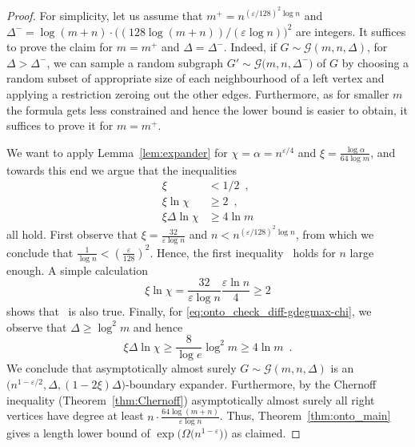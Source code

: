 \documentclass{theoretics}
\newcommand{\eqperiod}{\enspace .}
\newcommand{\eqcomma}{\enspace ,}
\newcommand{\refthm}[1]{Theorem~\ref{#1}}
\newcommand{\reflem}[1]{Lemma~\ref{#1}}
\newcommand{\diff}{\xi}
\newcommand{\ontocdiff}{64}
\newcommand{\GdegMax}{\Delta}
\newcommand{\gdegmax}{\GdegMax}
\newcommand{\Gdist}{\mathcal{G}}
\newcommand{\constonto}{128}
\newcommand{\exponentalpha}{\varepsilon}
\numberwithin{equation}{section}
\begin{document}
{
\begin{proof}
  For simplicity, let us assume that $m^{+} = n^{\left( \exponentalpha/\constonto \right)^2 \log n}$
  and $\gdegmax^{-} = \log (m + n) \cdot \bigl( ( \constonto \log (m + n))/
  (\exponentalpha \log n) \bigr)^2$ are
  integers.
  It suffices to prove the claim for 
  $m = m^{+}$ and $\gdegmax = \gdegmax^{-}$.
  Indeed, if $G \sim \Gdist \left(m,n,\GdegMax \right)$,
  for 
  $\GdegMax > \gdegmax^{-} $,
  we can sample a random subgraph
  $G' \sim \Gdist 
  \bigl(m,n,\gdegmax^{-} \bigr)$ of $G$
  by choosing a random subset of appropriate size of each neighbourhood
  of a left vertex and applying a restriction zeroing out the other
  edges.
  Furthermore,
  as for smaller $m$ the formula gets less constrained
  and hence the lower bound is easier to obtain, it suffices to prove it for
  $m = m^{+}$.

  We want to apply \reflem{lem:expander} for 
  $\chi = \alpha = n^{\exponentalpha/4}$
  and
  $\diff = \frac{\log \alpha}{\ontocdiff \log m}$,
  and towards this end we argue that
  the inequalities
  \begin{subequations}
    \begin{align}
      \label{eq:onto_check_diff}
      \diff &< 1/2 \eqcomma \\
      \label{eq:onto_check_diff-chi}
      \diff \ln \chi &\geq 2 \eqcomma \\
      \label{eq:onto_check_diff-gdegmax-chi}
      \diff \gdegmax \ln \chi &\geq 4 \ln m
    \end{align}
  \end{subequations}
  all hold.
  First observe that
  $\diff = \frac{32}{\exponentalpha \log n}$
  and 
  $n < n^{\left(\exponentalpha/\constonto\right)^2 \log n}$,
  from which we conclude that
  $\frac{1}{\log n} < \left(\frac{\exponentalpha}{\constonto}\right)^2$. 
  Hence, the first inequality~
  holds for $n$ large enough.
  A simple calculation
  \begin{equation}
  \diff \ln \chi 
  =
  \frac
  { 32  }
  { \varepsilon \log n}
  \frac{\varepsilon \ln n}{4}
   \ge 2
  \end{equation}
  shows that~ is also true.
  Finally, for
  \eqref{eq:onto_check_diff-gdegmax-chi},
  we observe that $\gdegmax \ge \log^2 m$ and hence
  \begin{equation}
    \diff \gdegmax \ln \chi 
    \ge
    \frac{8}{\log e} \log^2 m
    \ge  4 \ln m  \eqperiod
  \end{equation}
  We conclude 
  that
  asymptotically almost surely
  $G \sim \Gdist \left(m,n,\GdegMax \right)$ is an
  $\bigl( n^{1 - \exponentalpha/2}, \GdegMax, (1 - 2 \diff)\GdegMax
  \bigr)$-boundary expander.  Furthermore, by the Chernoff inequality
  (\refthm{thm:Chernoff}) asymptotically almost surely all right
  vertices have degree at least
  $n \cdot \frac{64 \log (m + n)}{\exponentalpha\log n}$. Thus,
  \refthm{thm:onto_main} gives a length lower bound of
  $\exp\bigl( \Omega \bigl( n^{1 - \exponentalpha} \bigr) \bigr)$
  as claimed.
\end{proof}
}
\end{document}
